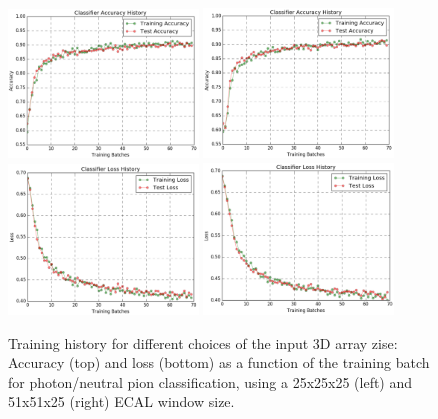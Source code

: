 \begin{figure}[htbp]
    \centering
    \includegraphics[width=0.45\textwidth]{Images/Calo/accuracy_small_window.png}
    \includegraphics[width=0.45\textwidth]{Images/Calo/accuracy_large_window.png} \\
    \includegraphics[width=0.45\textwidth]{Images/Calo/loss_small_window.png}
    \includegraphics[width=0.45\textwidth]{Images/Calo/loss_large_window.png}
    \caption{Training history for different choices of the input 3D array zise: Accuracy (top) and loss (bottom) as a function of the training batch for photon/neutral pion classification, using a 25x25x25 (left) and 51x51x25 (right) ECAL window size.\label{fig:classification_window}}
\end{figure}